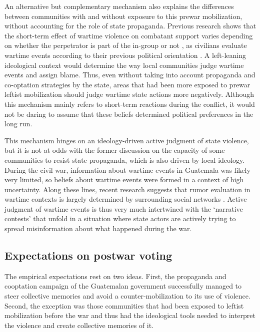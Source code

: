 \documentclass[12pt, notitlepage]{article}
\begin{document}
An alternative but complementary mechanism also explains the differences between communities with and without exposure to this prewar mobilization, without accounting for the role of state propaganda.
Previous research shows that the short-term effect of wartime violence on combatant support varies depending on whether the perpetrator is part of the in-group or not \citep{Lyall:2013aa}, as civilians evaluate wartime events according to their previous political orientation \citep{Pechenkina:2020ul, Silverman:2019aa}.
A left-leaning ideological context would determine the way local communities judge wartime events and assign blame.
Thus, even without taking into account propaganda and co-optation strategies by the state, areas that had been more exposed to prewar leftist mobilization should judge wartime state actions more negatively.
Although this mechanism mainly refers to short-term reactions during the conflict, it would not be daring to assume that these beliefs determined political preferences in the long run.

This mechanism hinges on an ideology-driven active judgment of state violence, but it is not at odds with the former discussion on the capacity of some communities to resist state propaganda, which is also driven by local ideology.
During the civil war, information about wartime events in Guatemala was likely very limited, so beliefs about wartime events were formed in a context of high uncertainty.
Along these lines, recent research suggests that rumor evaluation in wartime contexts is largely determined by surrounding social networks \citet{Schon:2021wf}.
Active judgment of wartime events is thus very much intertwined with the `narrative contests' that unfold in a situation where state actors are actively trying to spread misinformation about what happened during the war.


\subsection*{Expectations on postwar voting}

The empirical expectations rest on two ideas.
First, the propaganda and cooptation campaign of the Guatemalan government successfully managed to steer collective memories and avoid a counter-mobilization to its use of violence.
Second, the exception was those communities that had been exposed to leftist mobilization before the war and thus had the ideological tools needed to interpret the violence and create collective memories of it.
\end{document}
